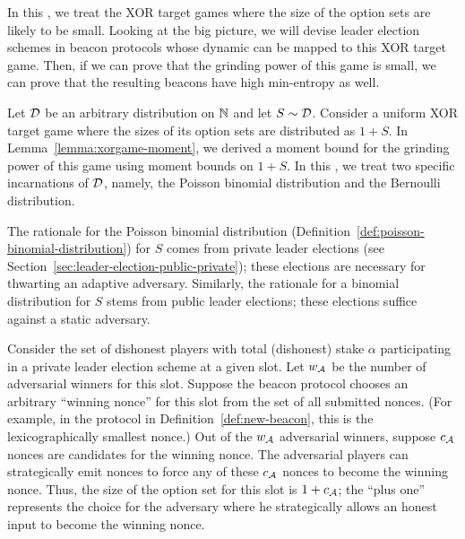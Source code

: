 
In this \Section, 
we treat the XOR target games where 
the size of the option sets are likely to be small. 
Looking at the big picture, 
we will devise leader election schemes in beacon protocols 
whose dynamic can be mapped to this XOR target game.
Then, if we can prove that the grinding power of this game is small, 
we can prove that the resulting beacons have high min-entropy as well.



Let $\mathcal{D}$ be an arbitrary distribution on $\mathbb{N}$ 
and let $S \sim \mathcal{D}$.
Consider a uniform XOR target game where 
the sizes of its option sets are distributed as $1 + S$. 
In Lemma~\ref{lemma:xorgame-moment}, 
we derived a moment bound for the grinding power of this game using moment bounds on $1 + S$. 
In this \Section, we treat two specific incarnations of $\mathcal{D}$, 
namely, the Poisson binomial distribution and 
the Bernoulli distribution.

The rationale for the Poisson binomial distribution (Definition~\ref{def:poisson-binomial-distribution}) 
for $S$ 
comes from private leader elections (see Section~\ref{sec:leader-election-public-private});
these elections are necessary for thwarting an adaptive adversary.
Similarly, the rationale for a binomial distribution for $S$ stems from 
public leader elections; 
these elections suffice against a static adversary.

Consider the set of dishonest players with total (dishonest) stake $\alpha$ 
participating 
in a private leader election scheme 
at a given slot. 
Let $w_{\mathcal{A}}$ be the number of adversarial winners for this slot.
Suppose the beacon protocol chooses an arbitrary ``winning nonce'' for this slot from the set of all submitted nonces.  
(For example, in the protocol in Definition~\ref{def:new-beacon}, this is the lexicographically smallest nonce.)
Out of the $w_{\mathcal{A}}$ adversarial winners, 
suppose $c_{\mathcal{A}}$ nonces are candidates for the winning nonce. 
The adversarial players can strategically emit nonces 
to force any of these $c_{\mathcal{A}}$ nonces to become the winning nonce.
Thus, the size of the option set for this slot is $1 + c_{\mathcal{A}}$; 
the ``plus one'' represents the choice for the adversary where 
he strategically allows an honest input to become the winning nonce. 

